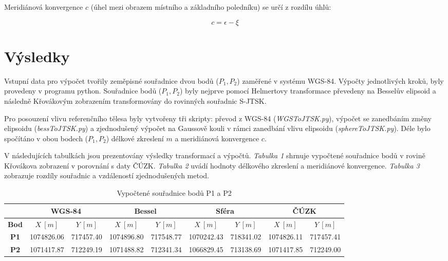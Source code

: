 \documentclass[12pt, a4paper]{article}
\begin{document}
\noindent Meridiánová konvergence $c$ (úhel mezi obrazem místního a základního poledníku) se určí z rozdílu úhlů:

\[ c = \epsilon - \xi \]

\newpage
\section*{Výsledky}
\vspace{5mm}
Vstupní data pro výpočet tvořily zeměpisné souřadnice dvou bodů ($P_1, P_2$) zaměřené v systému WGS-84. Výpočty jednotlivých kroků, byly provedeny v programu python. Souřadnice bodů ($P_1, P_2$) byly nejprve pomocí Helmertovy transformace převedeny na Besselův elipsoid a následně Křovákovým zobrazením transformovány do rovinných souřadnic S-JTSK.
\vspace{5mm}

\noindent Pro posouzení vlivu referenčního tělesa byly vytvořeny tři skripty: převod z WGS-84 (\textit{WGSToJTSK.py}), výpočet se zanedbáním změny elipsoidu (\textit{bessToJTSK.py}) a zjednodušený výpočet na Gaussově kouli v rámci zanedbání vlivu elipsoidu (\textit{sphereToJTSK.py}). Déle bylo spočítáno v obou bodech ($P_1, P_2$) délkové zkreslení $m$ a meridiánová konvergence $c$. 

\vspace{3mm}
\noindent V následujících tabulkách jsou prezentovány výsledky transformací a výpočtů. \textit{Tabulka 1} shrnuje vypočtené souřadnice bodů v rovině Křovákova zobrazení v porovnání s daty ČÚZK. \textit{Tabulka 2} uvádí hodnoty délkového zkreslení a meridiánové konvergence. \textit{Tabulka 3} zobrazuje rozdíly souřadnic a vzdáleností zjednodušených metod.
\vspace{10mm}

\begin{table}[htpb]
\centering
\footnotesize
\setlength{\tabcolsep}{4pt}
\begin{tabular}{|c|c|c|c|c|c|c|c|c|}
  \hline
  & \multicolumn{2}{c|}{\textbf{WGS-84}} & \multicolumn{2}{c|}{\textbf{Bessel}} & \multicolumn{2}{c|}{\textbf{Sféra}} & \multicolumn{2}{c|}{\textbf{ČÚZK}} \\ \hline
  \textbf{Bod} & $X \ [m]$ & $Y \ [m]$ & $X \ [m]$ & $Y \ [m]$ & $X \ [m]$ & $Y \ [m]$ & $X \ [m]$ & $Y \ [m]$ \\ \hline
  \textbf{P1} & 1074826.06 & 717457.40 & 1074896.80 & 717548.77 & 1070242.43 & 718341.02 & 1074826.11 & 717457.41 \\ \hline
  \textbf{P2} & 1071417.87 & 712249.19 & 1071488.82 & 712341.34 & 1066829.45 & 713138.69 & 1071417.85 & 712249.00 \\ \hline
\end{tabular}
\caption{Vypočtené souřadnice bodů P1 a P2}
\end{table}
\end{document}
